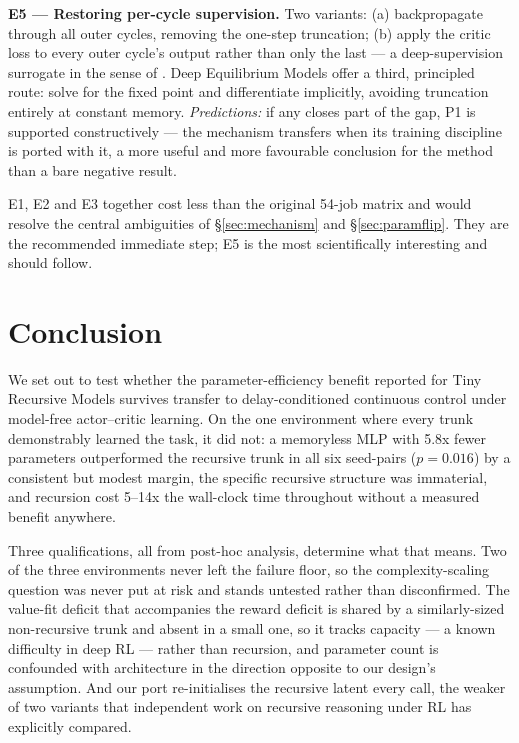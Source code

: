 \documentclass[11pt]{article}
\begin{document}
\textbf{E5 --- Restoring per-cycle supervision.} Two variants: (a) backpropagate through all outer cycles, removing the one-step truncation; (b) apply the critic loss to every outer cycle's output rather than only the last --- a deep-supervision surrogate in the sense of \citet{lee2015dsn}. Deep Equilibrium Models \citep{bai2019deq} offer a third, principled route: solve for the fixed point and differentiate implicitly, avoiding truncation entirely at constant memory. \emph{Predictions:} if any closes part of the gap, P1 is supported constructively --- the mechanism transfers when its training discipline is ported with it, a more useful and more favourable conclusion for the method than a bare negative result.

E1, E2 and E3 together cost less than the original 54-job matrix and would resolve the central ambiguities of \S\ref{sec:mechanism} and \S\ref{sec:paramflip}. They are the recommended immediate step; E5 is the most scientifically interesting and should follow.

\section{Conclusion}

We set out to test whether the parameter-efficiency benefit reported for Tiny Recursive Models survives transfer to delay-conditioned continuous control under model-free actor--critic learning. On the one environment where every trunk demonstrably learned the task, it did not: a memoryless MLP with 5.8x fewer parameters outperformed the recursive trunk in all six seed-pairs ($p=0.016$) by a consistent but modest margin, the specific recursive structure was immaterial, and recursion cost 5--14x the wall-clock time throughout without a measured benefit anywhere.

Three qualifications, all from post-hoc analysis, determine what that means. Two of the three environments never left the failure floor, so the complexity-scaling question was never put at risk and stands untested rather than disconfirmed. The value-fit deficit that accompanies the reward deficit is shared by a similarly-sized non-recursive trunk and absent in a small one, so it tracks capacity --- a known difficulty in deep RL --- rather than recursion, and parameter count is confounded with architecture in the direction opposite to our design's assumption. And our port re-initialises the recursive latent every call, the weaker of two variants that independent work on recursive reasoning under RL has explicitly compared.
\end{document}
